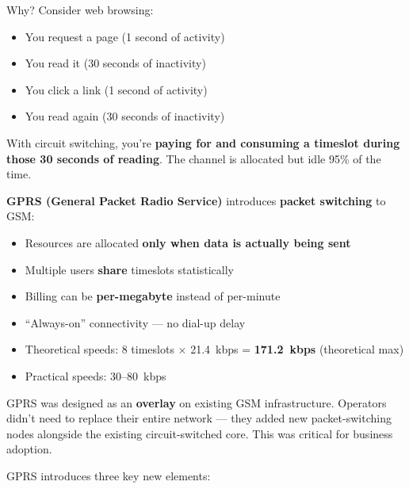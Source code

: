 Why? Consider web browsing:

\begin{itemize}
\tightlist
\item
  You request a page (1 second of activity)
\item
  You read it (30 seconds of inactivity)
\item
  You click a link (1 second of activity)
\item
  You read again (30 seconds of inactivity)
\end{itemize}

With circuit switching, you’re \textbf{paying for and consuming a timeslot during those 30 seconds of reading}. The channel is allocated but idle 95\% of the time.


\textbf{GPRS (General Packet Radio Service)} introduces \textbf{packet switching} to GSM:

\begin{itemize}
\tightlist
\item
  Resources are allocated \textbf{only when data is actually being sent}
\item
  Multiple users \textbf{share} timeslots statistically
\item
  Billing can be \textbf{per-megabyte} instead of per-minute
\item
  ``Always-on'' connectivity — no dial-up delay
\item
  Theoretical speeds: 8 timeslots \ensuremath{\times} 21.4~kbps = \textbf{171.2~kbps} (theoretical max)
\item
  Practical speeds: 30–80~kbps
\end{itemize}


GPRS was designed as an \textbf{overlay} on existing GSM infrastructure. Operators didn’t need to replace their entire network — they added new packet-switching nodes alongside the existing circuit-switched core. This was critical for business adoption.



\CNchained{}

GPRS introduces three key new elements:


